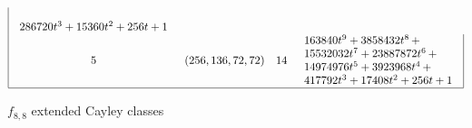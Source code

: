 \documentclass[12pt,a4paper]{article}
\begin{document}
\begin{table}[!bhpt]
\begin{align*}
\begin{array}{|cccl|}
\begin{array}{l}
\\
 286720t^{3} + 15360t^{2} + 256t + 1
\end{array}
\\
5 &
(256, 136, 72, 72) &
14 &
\begin{array}{l}
163840t^{9} + 3858432t^{8}
\,+
\\
 15532032t^{7} + 23887872t^{6}
\,+
\\
 14974976t^{5} + 3923968t^{4}
\,+
\\
 417792t^{3} + 17408t^{2} + 256t + 1
\end{array}
\\
\hline
\end{array}
\end{align*}
\caption{$f_{8,8}$ extended Cayley classes}
\label{tab-c8_8_EC_classes}
\end{table}
\end{document}
